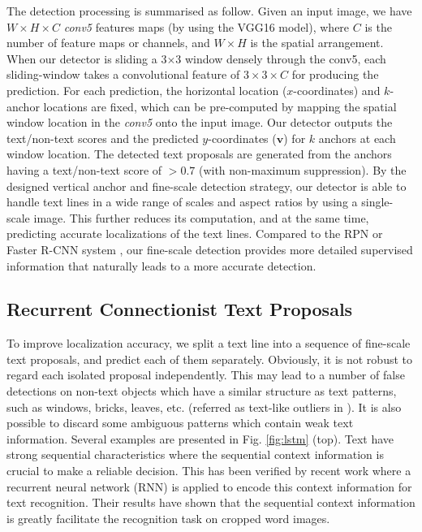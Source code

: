 \documentclass[runningheads]{llncs}
\begin{document}
The detection processing is summarised as follow. Given an input image, we have $W \times H \times C$  \textit{conv5} features maps (by using the VGG16 model), where $C$ is the number of feature maps or channels, and $W \times H$ is the spatial arrangement. When our detector is  sliding a 3$\times$3 window densely through the conv5, each sliding-window takes a convolutional feature of $3 \times 3 \times C$ for producing the prediction. For each prediction, the horizontal location ($x$-coordinates) and $k$-anchor locations  are fixed, which can be pre-computed by mapping the spatial window location in the \textit{conv5} onto the input image. Our detector outputs the text/non-text scores and the predicted $y$-coordinates ($\textbf{v}$) for $k$ anchors at each window location.
The detected text proposals are generated from the anchors having a text/non-text score of $>0.7$  (with non-maximum suppression).
By the designed vertical anchor and fine-scale detection strategy, our detector is able to handle text lines in a wide range of scales and aspect ratios by using a single-scale image. This further reduces its computation, and at the same time, predicting accurate localizations of the text lines. Compared to the RPN or Faster R-CNN system \cite{Ren2015}, our fine-scale detection provides more detailed supervised information that naturally leads to a more accurate detection.

\subsection{Recurrent Connectionist Text Proposals} 
To improve localization accuracy, we split a text line into a sequence of fine-scale text proposals, and predict each of them separately. Obviously, it is not robust to regard each isolated proposal independently. This may lead to a number of false detections on non-text objects which have a similar structure as text patterns,  such as windows, bricks, leaves, etc. (referred as text-like outliers in \cite{Huang2013}). It is also possible to discard some ambiguous  patterns which contain weak text information. Several examples are presented in Fig. \ref{fig:lstm} (top). Text have  strong sequential characteristics where the sequential context information is crucial to make a reliable decision. This has been verified by recent work \cite{He2015} where a recurrent neural network (RNN) is applied to encode this context information for text recognition. Their results have shown that the sequential context information is greatly facilitate the recognition task on cropped word images. 
\end{document}
